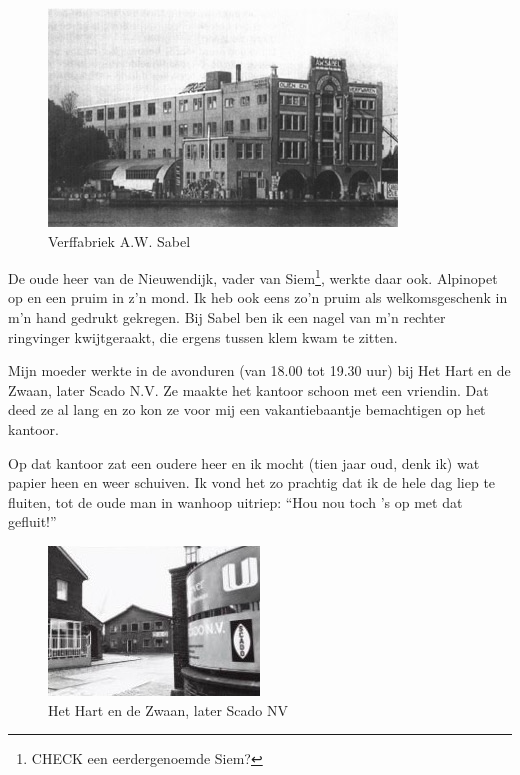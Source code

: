 \documentclass[12pt,twoside, openright]{memoir}
\begin{document}
\begin{figure}
\includegraphics[width=\textwidth]{img/ch32/Sabel met_stoom15}
\caption*{\footnotesize Verffabriek A.W. Sabel}
\end{figure}


De oude heer van de Nieuwendijk, vader van Siem\footnote{CHECK een eerdergenoemde Siem?}, werkte daar ook. Alpinopet op en een pruim in z’n mond. Ik heb ook eens zo’n pruim als welkomsgeschenk in m’n hand gedrukt gekregen. Bij Sabel ben ik een nagel van m’n rechter ringvinger kwijtgeraakt, die ergens tussen klem kwam te zitten.

Mijn moeder werkte in de avonduren (van 18.00 tot 19.30 uur) bij Het Hart en de Zwaan, later Scado N.V. Ze maakte het kantoor schoon met een vriendin. Dat deed ze al lang en zo kon ze voor mij een vakantiebaantje bemachtigen op het kantoor. 

Op dat kantoor zat een oudere heer en ik mocht (tien jaar oud, denk ik) wat papier heen en weer schuiven. Ik vond het zo prachtig dat ik de hele dag liep te fluiten, tot de oude man in wanhoop uitriep: ``Hou nou toch ’s op met dat gefluit!''

\begin{figure}
\includegraphics[width=\textwidth]{img/ch32/scado}
\caption*{\footnotesize Het Hart en de Zwaan, later Scado NV}
\end{figure}
\end{document}
